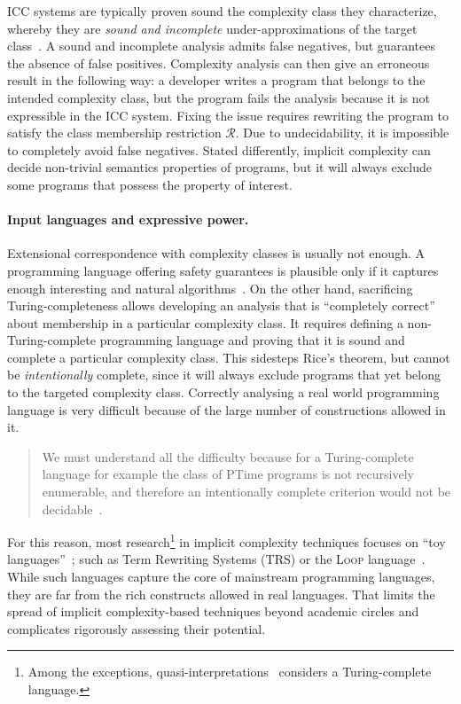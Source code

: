 ICC systems are typically proven sound \wrt the complexity class they characterize, whereby they are \emph{sound and incomplete} under-approximations of the target class~\cite[p. 125]{moyen2017}.
A sound and incomplete analysis admits false negatives, but guarantees the absence of false positives.
Complexity analysis can then give an erroneous result in the following way:
a developer writes a program that belongs to the intended complexity class,
but the program fails the analysis because it is not expressible in the ICC system.
Fixing the issue requires rewriting the program to satisfy the class membership restriction \(\mathcal{R}\).
Due to undecidability, it is impossible to completely avoid false negatives.
Stated differently, implicit complexity can decide non-trivial semantics properties of programs, but it will always exclude some programs that possess the property of interest.

\paragraph*{Input languages and expressive power.}
Extensional correspondence with complexity classes is usually not enough.
A programming language offering safety guarantees is plausible only
if it captures enough interesting and natural algorithms~\cite{baillot2012}.
On the other hand, sacrificing Turing-completeness allows developing an analysis that is \enquote{completely correct} about membership in a particular complexity class.
It requires defining a non-Turing-complete programming language and proving that it is sound and complete \wrt a particular complexity class.
This sidesteps Rice's theorem, but cannot be \emph{intentionally} complete, since it will always exclude programs that yet belong to the targeted complexity class.
Correctly analysing a real world programming language is very difficult because of the large number of constructions allowed in it.

\begin{quotation}
    \noindent We must understand all the diﬃculty because for a Turing-complete language for example the class of PTime programs is not recursively enumerable, and therefore an intentionally complete criterion would not be decidable~\cite[Sect. 4.1]{mogbil2012}.
\end{quotation}

\noindent For this reason, most research\footnote{
    Among the exceptions, quasi-interpretations~\cite{marion2000} considers a Turing-complete language.}
in implicit complexity techniques focuses on \enquote{toy languages}~\cite{moyen2017,rubiano17};
such as Term Rewriting Systems (TRS) or the \textsc{Loop} language~\cite{kristiansen2005}.
While such languages capture the core of mainstream programming languages, they are far from the rich constructs allowed in real languages.
That limits the spread of implicit complexity-based techniques beyond academic circles and complicates rigorously assessing their potential.

